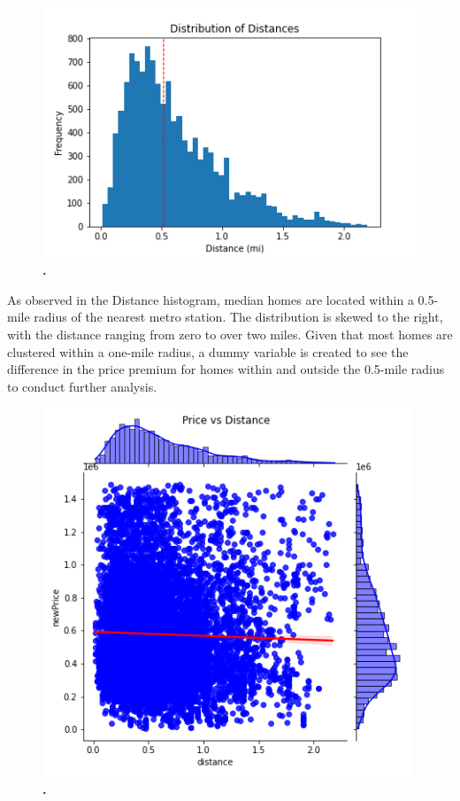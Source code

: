 \documentclass[12pt]{report}
\begin{document}
\begin{figure}[h]
\begin{center}
\includegraphics[width=130mm]{distanceHist.png}
\end{center}
\caption{\textbf{.}}
\label{fig:distanceHist}
\end{figure}
As observed in the Distance histogram, median homes are located within a 0.5-mile radius of the nearest metro station. The distribution is skewed to the right, with the distance ranging from zero to over two miles. Given that most homes are clustered within a one-mile radius, a dummy variable is created to see the difference in the price premium for homes within and outside the 0.5-mile radius to conduct further analysis.
\clearpage

\begin{figure}[h]
\begin{center}
\includegraphics[width=110mm]{DistanceJoint.png}
\end{center}
\caption{\textbf{.}}
\label{fig:distanceJoint}
\end{figure}
\end{document}
